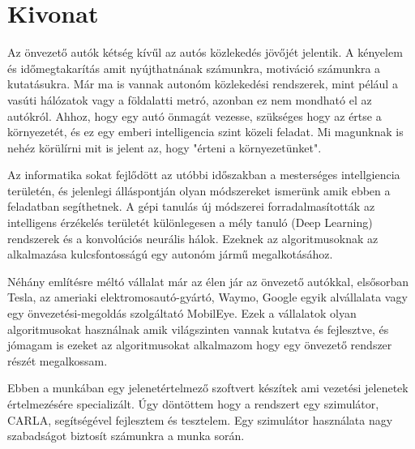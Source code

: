 \setcounter{page}{1}



\selecthungarian

\chapter*{Kivonat}

Az önvezető autók kétség kívűl az autós közlekedés jövőjét jelentik. A kényelem
és időmegtakarítás amit nyújthatnának számunkra, motiváció számunkra a
kutatásukra. Már ma is vannak autonóm közlekedési rendszerek, mint pélául a
vasúti hálózatok vagy a földalatti metró, azonban ez nem mondható el az
autókról. Ahhoz, hogy egy autó önmagát vezesse, szükséges hogy az értse a
környezetét, és ez egy emberi intelligencia szint közeli feladat. Mi magunknak is
nehéz körülírni mit is jelent az, hogy "érteni a környezetünket".

Az informatika sokat fejlődött az utóbbi időszakban a mesterséges intellgiencia
területén, és jelenlegi álláspontján olyan módszereket ismerünk amik ebben a
feladatban segíthetnek. A gépi tanulás új módszerei forradalmasították az
intelligens érzékelés területét különlegesen a mély tanuló (Deep Learning)
rendszerek és a konvolúciós neurális hálok. Ezeknek az algoritmusoknak az
alkalmazása kulcsfontosságú egy autonóm jármű megalkotásához.

Néhány említésre méltó vállalat már az élen jár az önvezető autókkal, elsősorban
Tesla, az ameriaki elektromosautó-gyártó, Waymo, Google egyik alvállalata vagy
egy önvezetési-megoldás szolgáltató MobilEye. Ezek a vállalatok olyan
algoritmusokat használnak amik világszinten vannak kutatva és fejlesztve, és
jómagam is ezeket az algoritmusokat alkalmazom hogy egy önvezető rendszer
részét megalkossam. 

Ebben a munkában egy jelenetértelmező szoftvert készítek ami vezetési jelenetek
értelmezésére specializált. Úgy döntöttem hogy a rendszert egy szimulátor,
CARLA, segítségével fejlesztem és tesztelem. Egy szimulátor használata nagy
szabadságot biztosít számunkra a munka során.


